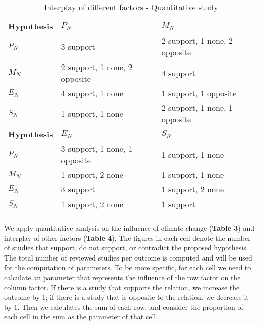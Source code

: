 \documentclass{mcmthesis}
\newlength\savedwidth
\newcommand\whline{\noalign{\global\savedwidth\arrayrulewidth
		\global\arrayrulewidth 1.2pt}%
	\hline
	\noalign{\global\arrayrulewidth\savedwidth}}
\newlength\savewidth
\newcommand\shline{\noalign{\global\savewidth\arrayrulewidth
		\global\arrayrulewidth 1.2pt}%
	\hline
	\noalign{\global\arrayrulewidth\savewidth}}
\begin{document}
	\begin{table}[htbp]
		\renewcommand\arraystretch{1.5}
		\footnotesize
		\centering
		\begin{tabular}{m{2.7cm}<{\centering}|m{5cm}<{\centering}|m{5cm}<{\centering}}
			\whline
			\textbf{Hypothesis}&\textbf{$P_N$}&\textbf{$M_N$}\\
			\whline
			\textbf{$P_N$}&3 support &2 support, 1 none, 2 opposite\\
			
			\textbf{$M_N$}&2 support, 1 none, 2 opposite&4 support\\
			
			\textbf{$E_N$}&4 support, 1 none&1 support, 1 opposite\\
			
			\textbf{$S_N$}&1 support, 1 none&2 support, 1 none, 1 opposite\\
			\shline
			\textbf{Hypothesis}&\textbf{$E_N$}&\textbf{$S_N$}\\
			\whline
			\textbf{$P_N$}& 3 support, 1 none, 1 opposite & 1 support, 1 none\\
			
			\textbf{$M_N$}&1 support, 2 none&1 support, 1 none\\
			
			\textbf{$E_N$}&3 support&1 support, 2 none\\
			
			\textbf{$S_N$}&1 support, 2 none&1 support\\
			\shline
		\end{tabular}
		\caption{Interplay of different factors - Quantitative study}\label{tab:Interplay of different factors - Quantitative study}
	\end{table}
	
	We apply quantitative analysis on the influence of climate change (\textbf{Table 3}) and interplay of other factors (\textbf{Table 4}). The figures in each cell denote the number of studies that support, do not support, or contradict the proposed hypothesis. The total number of
	reviewed studies per outcome is computed and will be used for the computation of parameters. To be more specific, for each cell we need to calculate an parameter that represents the influence of the row factor on the column factor. If there is a study that supports the relation, we increase the outcome by 1; if there is a study that is opposite to the relation, we decrease it by 1. Then we calculates the sum of each row, and consider the proportion of each cell in the sum as the parameter of that cell. 
	
\end{document}
